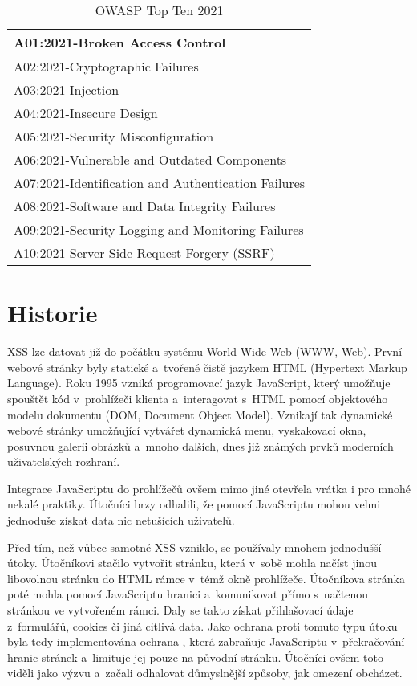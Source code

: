 \documentclass[11pt, conference, a4paper]{IEEEtran}
\begin{document}
\begin{table}[ht]
    \caption{OWASP Top Ten 2021 \cite{owasp-topten}}
    \label{tab:owasptop10}
    \centering
    \begin{tabular}{|l|}
        \hline
        A01:2021-Broken Access Control\\
        \hline
        A02:2021-Cryptographic Failures\\
        \hline
        A03:2021-Injection\\
        \hline
        A04:2021-Insecure Design\\
        \hline
        A05:2021-Security Misconfiguration\\
        \hline
        A06:2021-Vulnerable and Outdated Components\\
        \hline
        A07:2021-Identification and Authentication Failures\\
        \hline
        A08:2021-Software and Data Integrity Failures\\
        \hline
        A09:2021-Security Logging and Monitoring Failures\\
        \hline
        A10:2021-Server-Side Request Forgery (SSRF)\\
        \hline
    \end{tabular}
    
\end{table}

\section{Historie}
XSS lze datovat již do počátku systému World Wide Web (WWW, Web). První webové stránky byly statické a~tvořené čistě jazykem HTML (Hypertext Markup Language). Roku 1995 vzniká programovací jazyk JavaScript, který umožňuje spouštět kód v~prohlížeči klienta a~interagovat s~HTML pomocí objektového modelu dokumentu (DOM,  Document Object Model). Vznikají tak dynamické webové stránky umožňující vytvářet dynamická menu, vyskakovací okna, posuvnou galerii obrázků a~mnoho dalších, dnes již známých prvků moderních uživatelských rozhraní. 

Integrace JavaScriptu do prohlížečů ovšem mimo jiné otevřela vrátka i pro mnohé nekalé praktiky. Útočníci brzy odhalili, že pomocí JavaScriptu mohou velmi jednoduše získat data nic netušících uživatelů. 

Před tím, než vůbec samotné XSS vzniklo, se používaly mnohem jednodušší útoky. Útočníkovi stačilo vytvořit stránku, která v~sobě mohla načíst jinou libovolnou stránku do HTML rámce v~témž okně prohlížeče. Útočníkova stránka poté mohla pomocí JavaScriptu  hranici a~komunikovat přímo s~načtenou stránkou ve vytvořeném rámci. Daly se takto získat přihlašovací údaje z~formulářů, cookies či jiná citlivá data. Jako ochrana proti tomuto typu útoku byla tedy implementována ochrana , která zabraňuje JavaScriptu v~překračování hranic stránek a~limituje jej pouze na původní stránku. Útočníci ovšem toto viděli jako výzvu a~začali odhalovat důmyslnější způsoby, jak omezení obcházet.
\end{document}
